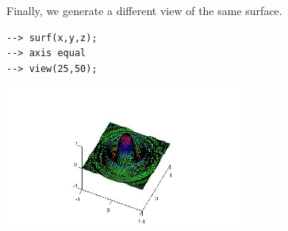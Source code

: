 Finally, we generate a different view of the same surface.
\begin{verbatim}
--> surf(x,y,z);
--> axis equal
--> view(25,50);
\end{verbatim}


\centerline{\includegraphics[width=8cm]{view3}}

